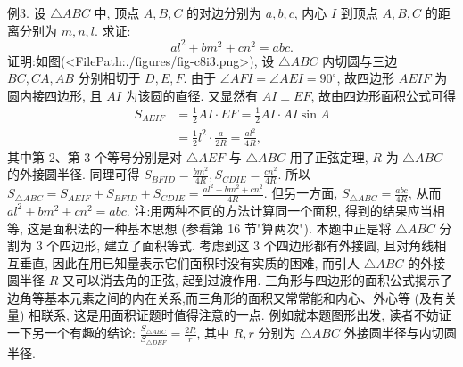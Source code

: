 例3. 设 $\triangle A B C$ 中, 顶点 $A, B, C$ 的对边分别为 $a, b, c$, 内心 $I$ 到顶点 $A, B, C$ 的距离分别为 $m, n, l$. 求证:
$$
a l^2+b m^2+c n^2=a b c .
$$
证明:如图(<FilePath:./figures/fig-c8i3.png>), 设 $\triangle A B C$ 内切圆与三边 $B C, C A, A B$ 分别相切于 $D, E, F$.
由于 $\angle A F I=\angle A E I=90^{\circ}$, 故四边形 $A E I F$ 为圆内接四边形, 且 $A I$ 为该圆的直径.
又显然有 $A I \perp E F$, 故由四边形面积公式可得
$$
\begin{aligned}
S_{A E I F} & =\frac{1}{2} A I \cdot E F=\frac{1}{2} A I \cdot A I \sin A \\
& =\frac{1}{2} l^2 \cdot \frac{a}{2 R}=\frac{a l^2}{4 R},
\end{aligned}
$$
其中第 2、第 3 个等号分别是对 $\triangle A E F$ 与 $\triangle A B C$ 用了正弦定理, $R$ 为 $\triangle A B C$ 的外接圆半径.
同理可得 $S_{B F I D}=\frac{b m^2}{4 R}, S_{C D I E}=\frac{c n^2}{4 R}$.
所以 $S_{\triangle A B C}=S_{A E I F}+S_{B F I D}+S_{C D I E}=\frac{a l^2+b m^2+c n^2}{4 R}$.
但另一方面, $S_{\triangle A B C}=\frac{a b c}{4 R}$, 从而 $a l^2+b m^2+c n^2=a b c$.
注:用两种不同的方法计算同一个面积, 得到的结果应当相等, 这是面积法的一种基本思想 (参看第 16 节"算两次"). 本题中正是将 $\triangle A B C$ 分割为 3 个四边形, 建立了面积等式.
考虑到这 3 个四边形都有外接圆, 且对角线相互垂直, 因此在用已知量表示它们面积时没有实质的困难, 而引人 $\triangle A B C$ 的外接圆半径 $R$ 又可以消去角的正弦, 起到过渡作用.
三角形与四边形的面积公式揭示了边角等基本元素之间的内在关系,而三角形的面积又常常能和内心、外心等 (及有关量) 相联系, 这是用面积证题时值得注意的一点.
例如就本题图形出发, 读者不妨证一下另一个有趣的结论: $\frac{S_{\triangle A B C}}{S_{\triangle D E F}}=\frac{2 R}{r}$, 其中 $R, r$ 分别为 $\triangle A B C$ 外接圆半径与内切圆半径.




